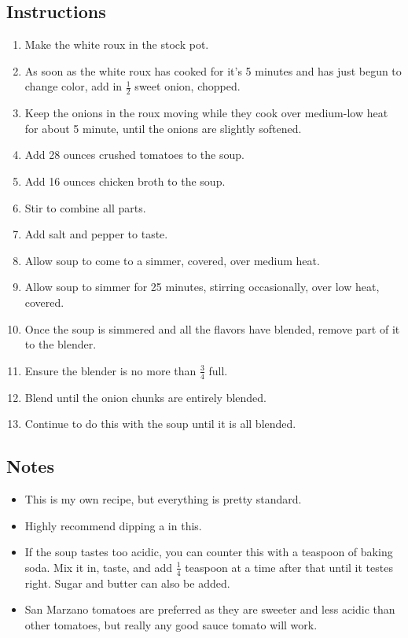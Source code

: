 \begin{multicols}{2}
\subsection*{Instructions}
\begin{enumerate}
    \item Make the white roux in the stock pot.
    \item As soon as the white roux has cooked for it's 5 minutes and has just begun to change color, add in \( \frac{1}{2} \) sweet onion, chopped.
    \item Keep the onions in the roux moving while they cook over medium-low heat for about 5 minute, until the onions are slightly softened.
    \item Add 28 ounces crushed tomatoes to the soup.
    \item Add 16 ounces chicken broth to the soup.
    \item Stir to combine all parts.
    \item Add salt and pepper to taste.
    \item Allow soup to come to a simmer, covered, over medium heat.
    \item Allow soup to simmer for 25 minutes, stirring occasionally, over low heat, covered.
    \item Once the soup is simmered and all the flavors have blended, remove part of it to the blender.
    \item Ensure the blender is no more than \( \frac{3}{4} \) full.
    \item Blend until the onion chunks are entirely blended.
    \item Continue to do this with the soup until it is all blended.
\end{enumerate}

\subsection*{Notes}
\begin{itemize}
    \item This is my own recipe, but everything is pretty standard.
    \item Highly recommend dipping a  in this.
    \item If the soup tastes too acidic, you can counter this with a teaspoon of baking soda. Mix it in, taste, and add \( \frac{1}{4} \) teaspoon at a time after that until it testes right. Sugar and butter can also be added.
    \item San Marzano tomatoes are preferred as they are sweeter and less acidic than other tomatoes, but really any good sauce tomato will work.
\end{itemize}
\end{multicols}
\clearpage